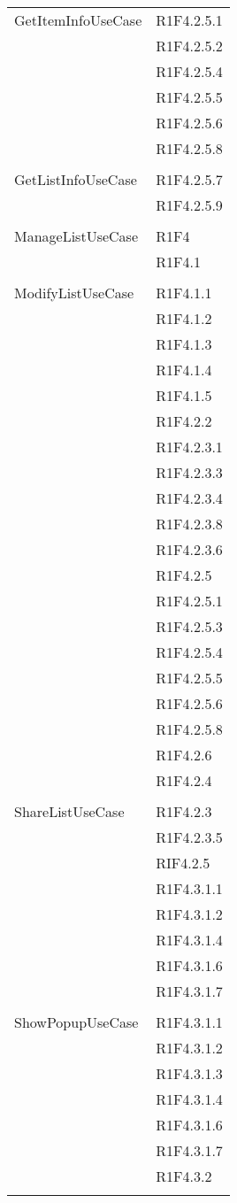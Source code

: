 \begin{center}
\begin{longtable}{|p{7cm}|p{5cm}|}
		GetItemInfoUseCase & R1F4.2.5.1 \\ & R1F4.2.5.2 \\ & R1F4.2.5.4 \\ & R1F4.2.5.5 \\ & R1F4.2.5.6 \\ & R1F4.2.5.8 \\ & \\ \hline
		GetListInfoUseCase & R1F4.2.5.7 \\ & R1F4.2.5.9 \\ & \\ \hline
		ManageListUseCase & R1F4 \\ & R1F4.1 \\ & \\ \hline
		ModifyListUseCase & R1F4.1.1 \\ & R1F4.1.2 \\ & R1F4.1.3 \\ & R1F4.1.4 \\ & R1F4.1.5 \\ & R1F4.2.2 \\ & R1F4.2.3.1 \\ & R1F4.2.3.3 \\ & R1F4.2.3.4 \\ & R1F4.2.3.8 \\ & R1F4.2.3.6 \\ & R1F4.2.5 \\ & R1F4.2.5.1 \\ & R1F4.2.5.3 \\ & R1F4.2.5.4 \\ & R1F4.2.5.5 \\ & R1F4.2.5.6 \\ & R1F4.2.5.8 \\ & R1F4.2.6 \\ & R1F4.2.4 \\ & \\ \hline
		ShareListUseCase & R1F4.2.3 \\ & R1F4.2.3.5 \\ & RIF4.2.5 \\ & R1F4.3.1.1 \\ & R1F4.3.1.2 \\ & R1F4.3.1.4 \\ & R1F4.3.1.6 \\ & R1F4.3.1.7 \\ & \\ \hline
		ShowPopupUseCase & R1F4.3.1.1 \\ & R1F4.3.1.2 \\ & R1F4.3.1.3 \\ & R1F4.3.1.4 \\ & R1F4.3.1.6 \\ & R1F4.3.1.7 \\ & R1F4.3.2 \\ & \\ \hline
	\end{longtable}
\end{center}
